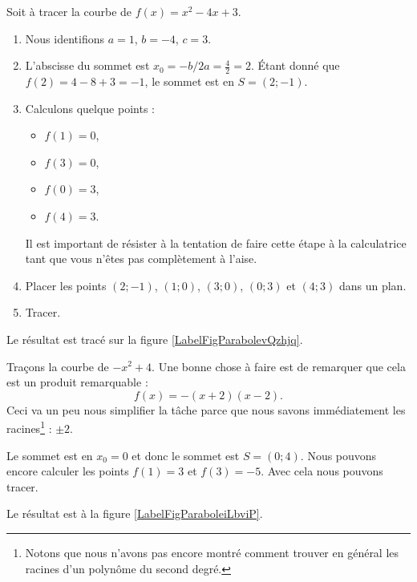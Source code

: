 \begin{example}
    Soit à tracer la courbe de \( f(x)=x^2-4x+3\).
    \begin{enumerate}
        \item
            Nous identifions \( a=1\), \( b=-4\), \( c=3\). 
        \item
            L'abscisse du sommet est \( x_0=-b/2a=\frac{ 4 }{2}=2\). Étant donné que \( f(2)=4-8+3=-1\), le sommet est en \( S=(2;-1)\).
        \item
            Calculons quelque points :
            \begin{itemize}
                \item \( f(1)=0\),
                \item
                    \( f(3)=0\),
                \item
                    \( f(0)=3\),
                \item
                    \( f(4)=3\).
            \end{itemize}
            Il est important de résister à la tentation de faire cette étape à la calculatrice tant que vous n'êtes pas complètement à l'aise.
        \item
            Placer les points \( (2;-1)\), \( (1;0)\), \( (3;0)\), \( (0;3)\) et \( (4;3)\) dans un plan.
        \item
            Tracer.
    \end{enumerate}
    Le résultat est tracé sur la figure \ref{LabelFigParabolevQzhjq}.
\newcommand{\CaptionFigParabolevQzhjq}{La courbe de la parabole \( x^2-4x+3\).}

\end{example}

\begin{example}
    Traçons la courbe de \( -x^2+4\). Une bonne chose à faire est de remarquer que cela est un produit remarquable :
    \begin{equation}
        f(x)=-(x+2)(x-2).
    \end{equation}
    Ceci va un peu nous simplifier la tâche parce que nous savons immédiatement les racines\footnote{Notons que nous n'avons pas encore montré comment trouver en général les racines d'un polynôme du second degré.} : \( \pm2\).

    Le sommet est en \( x_0=0\) et donc le sommet est \( S=(0;4)\). Nous pouvons encore calculer les points \( f(1)=3\) et \( f(3)=-5\). Avec cela nous pouvons tracer.

Le résultat est à la figure \ref{LabelFigParaboleiLbviP}.
\newcommand{\CaptionFigParaboleiLbviP}{La courbe de \( -x^2+4=-(x+2)(x-2)\).}


\end{example}

